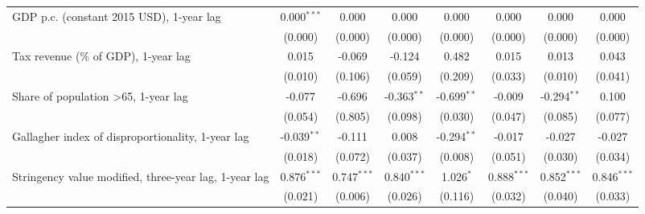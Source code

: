 \begin{table}[htbp]
\begin{tabular}{lccccccc}
      GDP p.c. (constant 2015 USD), 1-year lag                                                & 0.000$^{***}$ & 0.000                     & 0.000           & 0.000            & 0.000           & 0.000           & 0.000\\   
                                                                                              & (0.000)       & (0.000)                   & (0.000)         & (0.000)          & (0.000)         & (0.000)         & (0.000)\\   
      Tax revenue (\% of GDP), 1-year lag                                                     & 0.015         & -0.069                    & -0.124          & 0.482            & 0.015           & 0.013           & 0.043\\   
                                                                                              & (0.010)       & (0.106)                   & (0.059)         & (0.209)          & (0.033)         & (0.010)         & (0.041)\\   
      Share of population >65, 1-year lag                                                     & -0.077        & -0.696                    & -0.363$^{**}$   & -0.699$^{**}$    & -0.009          & -0.294$^{**}$   & 0.100\\   
                                                                                              & (0.054)       & (0.805)                   & (0.098)         & (0.030)          & (0.047)         & (0.085)         & (0.077)\\   
      Gallagher index of disproportionality, 1-year lag                                       & -0.039$^{**}$ & -0.111                    & 0.008           & -0.294$^{**}$    & -0.017          & -0.027          & -0.027\\   
                                                                                              & (0.018)       & (0.072)                   & (0.037)         & (0.008)          & (0.051)         & (0.030)         & (0.034)\\   
      Stringency value modified, three-year lag, 1-year lag                                   & 0.876$^{***}$ & 0.747$^{***}$             & 0.840$^{***}$   & 1.026$^{*}$      & 0.888$^{***}$   & 0.852$^{***}$   & 0.846$^{***}$\\   
                                                                                              & (0.021)       & (0.006)                   & (0.026)         & (0.116)          & (0.032)         & (0.040)         & (0.033)\\   

\end{tabular}
\end{table}
